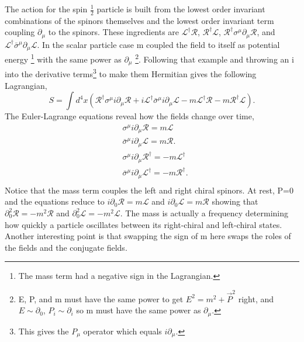 The action for the spin $\frac{1}{2}$ particle is built from the lowest order invariant combinations of the spinors themselves and the lowest order invariant term coupling $\partial_\mu$ to the spinors. These ingredients are $\mathcal{L}^\dagger\mathcal{R}$, $\mathcal{R}^\dagger\mathcal{L}$, $\mathcal{R}^\dagger\sigma^\mu\partial_\mu\mathcal{R}$, and $\mathcal{L}^\dagger\bar{\sigma}^\mu\partial_\mu\mathcal{L}$. In the scalar particle case m coupled the field to itself as potential energy \footnote{The mass term had a negative sign in the Lagrangian.} with the same power as $\partial_\mu$ \footnote{E, P, and m must have the same power to get $E^2 = m^2 + \vec{P}^2$ right, and $E \sim \partial_0$, $P_i \sim \partial_i$ so m must have the same power as $\partial_\mu$.}. Following that example and throwing an i into the derivative terms\footnote{This gives the $P_\mu$ operator which equals $i\partial_\mu$.} to make them Hermitian gives the following Lagrangian,  
\begin{equation}
S = \int d^4x \left( \mathcal{R}^\dagger\sigma^\mu i\partial_\mu\mathcal{R} + i\mathcal{L}^\dagger\bar{\sigma}^\mu i\partial_\mu\mathcal{L} 
- m\mathcal{L}^\dagger\mathcal{R} - m\mathcal{R}^\dagger\mathcal{L} \right).
\end{equation} 
The Euler-Lagrange equations reveal how the fields change over time,
\begin{equation}
\begin{split}
& \sigma^\mu i\partial_\mu\mathcal{R} = m\mathcal{L} \\
& \bar{\sigma}^\mu i\partial_\mu\mathcal{L} = m\mathcal{R}. \\
& \sigma^\mu i\partial_\mu\mathcal{R}^\dagger = -m\mathcal{L}^\dagger \\
& \bar{\sigma}^\mu i\partial_\mu\mathcal{L}^\dagger = -m\mathcal{R}^\dagger. \\
\end{split}
\end{equation}
Notice that the mass term couples the left and right chiral spinors. At rest, P=0 and the equations reduce to $i\partial_0\mathcal{R} = m\mathcal{L}$ and $i\partial_0\mathcal{L} = m\mathcal{R}$ showing that $\partial^2_0 \mathcal{R} = -m^2\mathcal{R}$ and $\partial^2_0 \mathcal{L} = -m^2\mathcal{L}$. The mass is actually a frequency determining how quickly a particle oscillates between its right-chiral and left-chiral states. Another interesting point is that swapping the sign of m here swaps the roles of the fields and the conjugate fields. 

